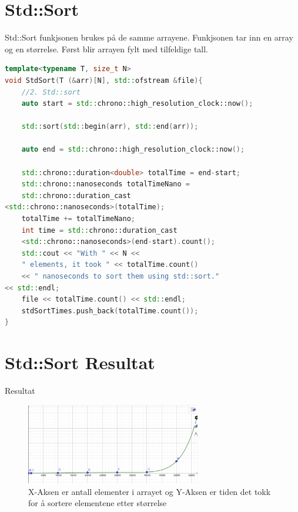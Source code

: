 \documentclass[a4paper,norsk]{article}
\begin{document}
\section{Std::Sort}Std::Sort funkjsonen brukes på de samme arrayene. Funkjsonen tar inn en array og en størrelse. Først blir arrayen fylt med tilfeldige tall. 
\begin{lstlisting}[language=C++, caption={main.cpp}]
template<typename T, size_t N>
void StdSort(T (&arr)[N], std::ofstream &file){
    //2. Std::sort
    auto start = std::chrono::high_resolution_clock::now();

    std::sort(std::begin(arr), std::end(arr));

    auto end = std::chrono::high_resolution_clock::now();

    std::chrono::duration<double> totalTime = end-start;
    std::chrono::nanoseconds totalTimeNano = 
	std::chrono::duration_cast
<std::chrono::nanoseconds>(totalTime);
    totalTime += totalTimeNano;
    int time = std::chrono::duration_cast
	<std::chrono::nanoseconds>(end-start).count();
    std::cout << "With " << N << 
	" elements, it took " << totalTime.count() 
	<< " nanoseconds to sort them using std::sort." 
<< std::endl;
    file << totalTime.count() << std::endl;
    stdSortTimes.push_back(totalTime.count());
}
\end{lstlisting}



\section{Std::Sort Resultat} 
Resultat
\begin{figure}
	\centering
	\includegraphics[width =3in]{StdSortGraph.png}
	\caption{X-Aksen er antall elementer i arrayet og Y-Aksen er tiden det tokk for å sortere elementene etter størrelse}
\end{figure}
\end{document}
